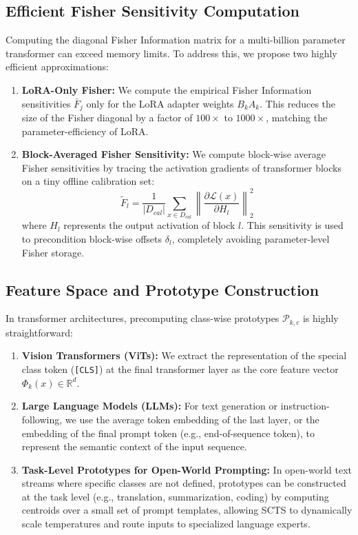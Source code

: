 \documentclass{article}
\theoremstyle{plain}
\theoremstyle{definition}
\theoremstyle{remark}
\begin{document}
\subsection{Efficient Fisher Sensitivity Computation}
Computing the diagonal Fisher Information matrix for a multi-billion parameter transformer can exceed memory limits. To address this, we propose two highly efficient approximations:
\begin{enumerate}
  \item \textbf{LoRA-Only Fisher:} We compute the empirical Fisher Information sensitivities $\bar{F}_j$ only for the LoRA adapter weights $B_k A_k$. This reduces the size of the Fisher diagonal by a factor of $100\times$ to $1000\times$, matching the parameter-efficiency of LoRA.
  \item \textbf{Block-Averaged Fisher Sensitivity:} We compute block-wise average Fisher sensitivities by tracing the activation gradients of transformer blocks on a tiny offline calibration set:
    \begin{equation}
      \tilde{F}_l = \frac{1}{|D_{cal}|} \sum_{x \in D_{cal}} \left\| \frac{\partial \mathcal{L}(x)}{\partial H_l} \right\|_2^2
    \end{equation}
    where $H_l$ represents the output activation of block $l$. This sensitivity is used to precondition block-wise offsets $\delta_l$, completely avoiding parameter-level Fisher storage.
\end{enumerate}

\subsection{Feature Space and Prototype Construction}
In transformer architectures, precomputing class-wise prototypes $\mathcal{P}_{k, c}$ is highly straightforward:
\begin{enumerate}
  \item \textbf{Vision Transformers (ViTs):} We extract the representation of the special class token (\texttt{[CLS]}) at the final transformer layer as the core feature vector $\Phi_k(x) \in \mathbb{R}^d$.
  \item \textbf{Large Language Models (LLMs):} For text generation or instruction-following, we use the average token embedding of the last layer, or the embedding of the final prompt token (e.g., end-of-sequence token), to represent the semantic context of the input sequence.
  \item \textbf{Task-Level Prototypes for Open-World Prompting:} In open-world text streams where specific classes are not defined, prototypes can be constructed at the task level (e.g., translation, summarization, coding) by computing centroids over a small set of prompt templates, allowing SCTS to dynamically scale temperatures and route inputs to specialized language experts.
\end{enumerate}
\end{document}
